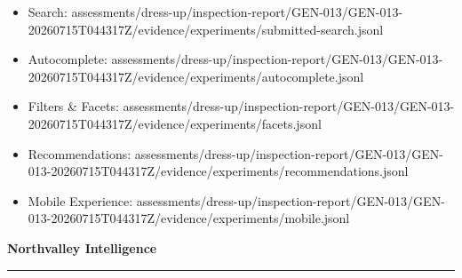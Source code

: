 \documentclass[10pt]{article}
\newcommand{\ReportFine}[1]{{\fontsize{7.6}{9.1}\selectfont\color{NVIMuted}#1}}
\begin{document}
\begin{itemize}
\item \ReportFine{Search: assessments/dress-up/inspection-report/GEN-013/GEN-013-20260715T044317Z/evidence/experiments/submitted-search.jsonl}
\item \ReportFine{Autocomplete: assessments/dress-up/inspection-report/GEN-013/GEN-013-20260715T044317Z/evidence/experiments/autocomplete.jsonl}
\item \ReportFine{Filters \& Facets: assessments/dress-up/inspection-report/GEN-013/GEN-013-20260715T044317Z/evidence/experiments/facets.jsonl}
\item \ReportFine{Recommendations: assessments/dress-up/inspection-report/GEN-013/GEN-013-20260715T044317Z/evidence/experiments/recommendations.jsonl}
\item \ReportFine{Mobile Experience: assessments/dress-up/inspection-report/GEN-013/GEN-013-20260715T044317Z/evidence/experiments/mobile.jsonl}
\end{itemize}
\vfill
\begin{center}
{\fontsize{16}{19}\selectfont\bfseries\color{NVIInk}Northvalley Intelligence}\\[0.06in]
{\color{NVIAccent}\rule{2.2in}{0.8pt}}\\[0.08in]
\ReportFine{\NorthvalleyContactLine}
\end{center}
\end{document}
